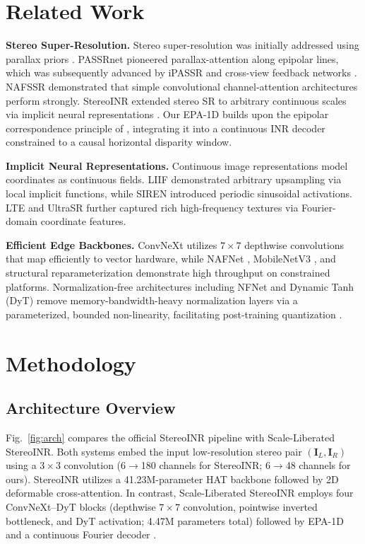 \documentclass[conference]{IEEEtran}
\newcommand{\ours}{Scale-Liberated StereoINR}
\begin{document}
\section{Related Work}
\textbf{Stereo Super-Resolution.} Stereo super-resolution was initially addressed using parallax priors \cite{stereosr}. PASSRnet \cite{passr} pioneered parallax-attention along epipolar lines, which was subsequently advanced by iPASSR \cite{ipassr} and cross-view feedback networks \cite{ssrdefnet}. NAFSSR \cite{nafssr} demonstrated that simple convolutional channel-attention architectures perform strongly. StereoINR \cite{stereoinr} extended stereo SR to arbitrary continuous scales via implicit neural representations \cite{liif}. Our EPA-1D builds upon the epipolar correspondence principle of \cite{passr}, integrating it into a continuous INR decoder constrained to a causal horizontal disparity window.

\textbf{Implicit Neural Representations.} Continuous image representations model coordinates as continuous fields. LIIF \cite{liif} demonstrated arbitrary upsampling via local implicit functions, while SIREN \cite{siren} introduced periodic sinusoidal activations. LTE \cite{lte} and UltraSR \cite{ultrasr} further captured rich high-frequency textures via Fourier-domain coordinate features.

\textbf{Efficient Edge Backbones.} ConvNeXt \cite{convnext} utilizes $7{\times}7$ depthwise convolutions that map efficiently to vector hardware, while NAFNet \cite{nafnet}, MobileNetV3 \cite{mobilenetv3}, and structural reparameterization \cite{repvgg} demonstrate high throughput on constrained platforms. Normalization-free architectures including NFNet \cite{nfnet} and Dynamic Tanh (DyT) \cite{dyt} remove memory-bandwidth-heavy normalization layers via a parameterized, bounded non-linearity, facilitating post-training quantization \cite{ptq}.

\section{Methodology}

\subsection{Architecture Overview}
Fig.~\ref{fig:arch} compares the official StereoINR pipeline with \ours{}. Both systems embed the input low-resolution stereo pair $(\mathbf{I}_L, \mathbf{I}_R)$ using a $3{\times}3$ convolution (6$\to$180 channels for StereoINR; 6$\to$48 channels for ours). StereoINR utilizes a 41.23M-parameter HAT backbone followed by 2D deformable cross-attention. In contrast, \ours{} employs four ConvNeXt--DyT blocks \cite{convnext, dyt} (depthwise $7{\times}7$ convolution, pointwise inverted bottleneck, and DyT activation; 4.47M parameters total) followed by EPA-1D and a continuous Fourier decoder \cite{lte, ultrasr}.
\end{document}
